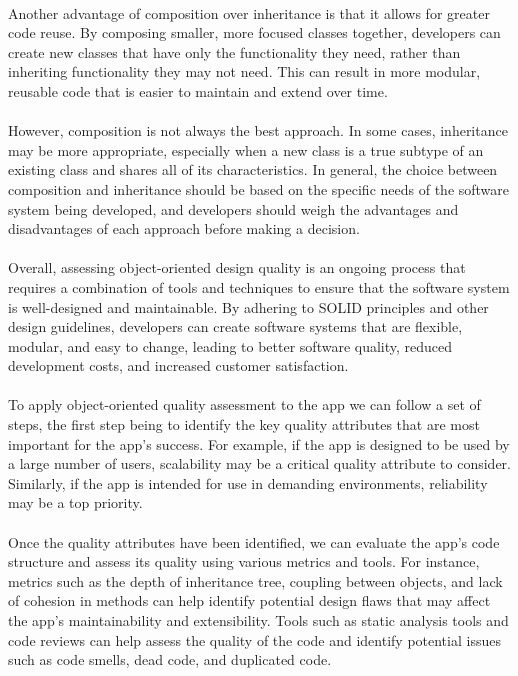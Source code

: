 \paragraph{}
Another advantage of composition over inheritance is that it allows for greater code reuse. By composing smaller, more focused classes together, developers can create new classes that have only the functionality they need, rather than inheriting functionality they may not need. This can result in more modular, reusable code that is easier to maintain and extend over time.

\paragraph{}
However, composition is not always the best approach. In some cases, inheritance may be more appropriate, especially when a new class is a true subtype of an existing class and shares all of its characteristics. In general, the choice between composition and inheritance should be based on the specific needs of the software system being developed, and developers should weigh the advantages and disadvantages of each approach before making a decision.

\paragraph{}
Overall, assessing object-oriented design quality is an ongoing process that requires a combination of tools and techniques to ensure that the software system is well-designed and maintainable. By adhering to SOLID principles and other design guidelines, developers can create software systems that are flexible, modular, and easy to change, leading to better software quality, reduced development costs, and increased customer satisfaction.


\paragraph{}
To apply object-oriented quality assessment to the app we can follow a set of steps, the first step being to identify the key quality attributes that are most important for the app's success. For example, if the app is designed to be used by a large number of users, scalability may be a critical quality attribute to consider. Similarly, if the app is intended for use in demanding environments, reliability may be a top priority.

\paragraph{}
Once the quality attributes have been identified, we can evaluate the app's code structure and assess its quality using various metrics and tools. For instance, metrics such as the depth of inheritance tree, coupling between objects, and lack of cohesion in methods can help identify potential design flaws that may affect the app's maintainability and extensibility. Tools such as static analysis tools and code reviews can help assess the quality of the code and identify potential issues such as code smells, dead code, and duplicated code.


